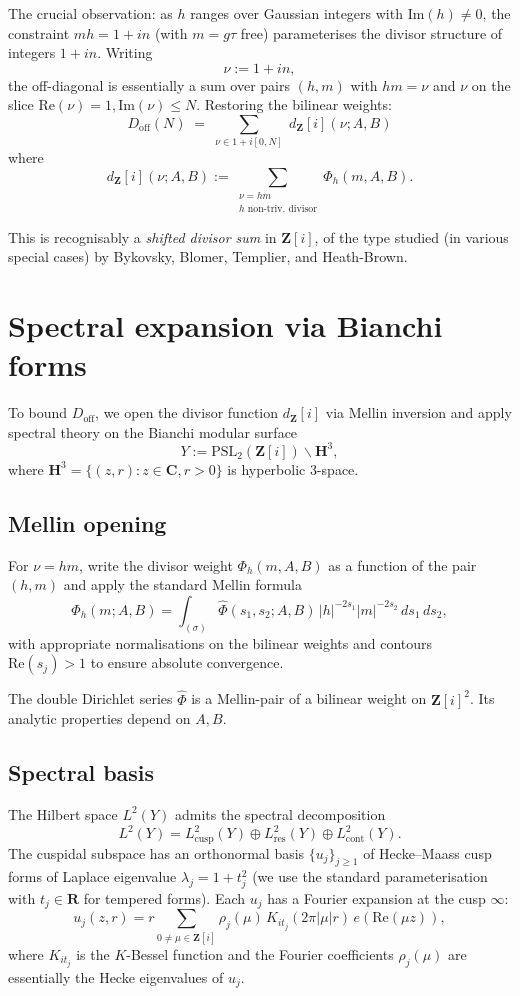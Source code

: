 \documentclass[11pt]{article}
\theoremstyle{definition}
\newcommand{\Z}{\mathbf{Z}}
\newcommand{\R}{\mathbf{R}}
\newcommand{\C}{\mathbf{C}}
\newcommand{\HH}{\mathbf{H}}
\newcommand{\Zi}{\Z[i]}
\newcommand{\Re}{\mathrm{Re}}
\newcommand{\Im}{\mathrm{Im}}
\renewcommand{\Re}{\mathrm{Re}}
\renewcommand{\Im}{\mathrm{Im}}
\begin{document}
The crucial observation: as $h$ ranges over Gaussian integers with $\Im(h)\ne 0$, the constraint $mh=1+in$ (with $m=g\tau$ free) parameterises the divisor structure of integers $1+in$. Writing
\[
\nu:=1+in,
\]
the off-diagonal is essentially a sum over pairs $(h,m)$ with $hm=\nu$ and $\nu$ on the slice $\Re(\nu)=1,\Im(\nu)\le N$. Restoring the bilinear weights:
\[
D_{\mathrm{off}}(N)\;=\;\sum_{\nu\in 1+i[0,N]}\;d_\Zi(\nu;A,B)
\]
where
\begin{equation}\label{eq:dABdef}
d_\Zi(\nu;A,B):=\sum_{\substack{\nu=hm\\h\text{ non-triv. divisor}}}\Phi_h(m,A,B).
\end{equation}

This is recognisably a \emph{shifted divisor sum} in $\Zi$, of the type studied (in various special cases) by Bykovsky, Blomer, Templier, and Heath-Brown.

\section{Spectral expansion via Bianchi forms}\label{sec:bianchi}

To bound $D_{\mathrm{off}}$, we open the divisor function $d_\Zi$ via Mellin inversion and apply spectral theory on the Bianchi modular surface
\[
Y:=\mathrm{PSL}_2(\Zi)\backslash\HH^3,
\]
where $\HH^3=\{(z,r):z\in\C,r>0\}$ is hyperbolic $3$-space.

\subsection{Mellin opening}

For $\nu=hm$, write the divisor weight $\Phi_h(m,A,B)$ as a function of the pair $(h,m)$ and apply the standard Mellin formula
\[
\Phi_h(m;A,B)=\int_{(\sigma)}\widehat\Phi(s_1,s_2;A,B)\,|h|^{-2s_1}|m|^{-2s_2}\,ds_1\,ds_2,
\]
with appropriate normalisations on the bilinear weights and contours $\Re(s_j)>1$ to ensure absolute convergence.

The double Dirichlet series $\widehat\Phi$ is a Mellin-pair of a bilinear weight on $\Zi^2$. Its analytic properties depend on $A,B$.

\subsection{Spectral basis}

The Hilbert space $L^2(Y)$ admits the spectral decomposition
\[
L^2(Y)=L^2_{\mathrm{cusp}}(Y)\oplus L^2_{\mathrm{res}}(Y)\oplus L^2_{\mathrm{cont}}(Y).
\]
The cuspidal subspace has an orthonormal basis $\{u_j\}_{j\ge 1}$ of Hecke--Maass cusp forms of Laplace eigenvalue $\lambda_j=1+t_j^2$ (we use the standard parameterisation with $t_j\in\R$ for tempered forms). Each $u_j$ has a Fourier expansion at the cusp $\infty$:
\[
u_j(z,r)=r\sum_{0\ne\mu\in\Zi}\rho_j(\mu)\,K_{it_j}(2\pi|\mu|r)\,e(\Re(\mu z)),
\]
where $K_{it_j}$ is the $K$-Bessel function and the Fourier coefficients $\rho_j(\mu)$ are essentially the Hecke eigenvalues of $u_j$.
\end{document}
